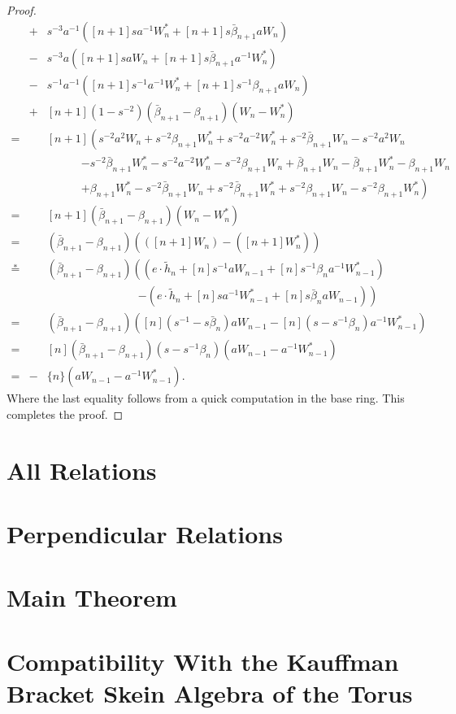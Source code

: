 \begin{proof}
\begin{eqnarray*}
&+& s^{-3}a^{-1}\left( [n+1]sa^{-1}W^*_n + [n+1]s\bar{\beta}_{n+1}aW_n \right) \\
&-&s^{-3}a\left( [n+1]saW_n + [n+1]s\bar{\beta}_{n+1}a^{-1}W^*_n \right) \\
&-& s^{-1}a^{-1}\left( [n+1]s^{-1}a^{-1}W^*_n + [n+1]s^{-1}\beta_{n+1}aW_n \right) \\
&+& [n+1]\left(1-s^{-2} \right) \left( \bar{\beta}_{n+1} - \beta_{n+1} \right) \left( W_n - W^*_n \right)\\
=&& [n+1]\left( s^{-2}a^2W_n + s^{-2}\beta_{n+1}W^*_n + s^{-2}a^{-2}W^*_n + s^{-2}\bar{\beta}_{n+1}W_n - s^{-2}a^{2}W_n \right. \\
&&\qquad\quad \left. - s^{-2}\bar{\beta}_{n+1}W^*_n - s^{-2}a^{-2}W^*_n - s^{-2}\beta_{n+1}W_n + \bar{\beta}_{n+1}W_n - \bar{\beta}_{n+1}W^*_n - \beta_{n+1}W_n \right. \\
&&\qquad\quad \left. + \beta_{n+1}W^*_n - s^{-2}\bar{\beta}_{n+1}W_n + s^{-2}\bar{\beta}_{n+1}W^*_n + s^{-2}\beta_{n+1}W_n - s^{-2}\beta_{n+1}W^*_n \right) \\
=&& [n+1]\left( \bar{\beta}_{n+1} - \beta_{n+1} \right) \left( W_n - W^*_n \right) \\
=&& \left( \bar{\beta}_{n+1} - \beta_{n+1} \right) \left( \left( [n+1]W_n \right) - \left( [n+1]W^*_n \right) \right) \\
\overset{\ast}{=}&& \left( \bar{\beta}_{n+1} - \beta_{n+1} \right) \left( \left( e \cdot \tilde{h}_{n} + [n]s^{-1}aW_{n-1} + [n]s^{-1}\beta_{n}a^{-1}W^*_{n-1} \right) \right. \\
&& \qquad\qquad\qquad\qquad \left. -\left( e \cdot \tilde{h}_{n} + [n]sa^{-1}W^*_{n-1} + [n]s\bar{\beta}_{n}aW_{n-1} \right) \right) \\
=&& \left( \bar{\beta}_{n+1} - \beta_{n+1} \right) \left( [n]\left( s^{-1} - s\bar{\beta}_{n} \right) aW_{n-1} - [n]\left( s-s^{-1}\beta_{n} \right) a^{-1}W^*_{n-1} \right) \\
=&& [n]\left(\bar{\beta}_{n+1} - \beta_{n+1} \right) \left( s - s^{-1}\beta_{n} \right) \left( aW_{n-1} - a^{-1}W^*_{n-1} \right) \\
=&-& \{n\}\left( aW_{n-1} - a^{-1}W^*_{n-1} \right).
\end{eqnarray*}
Where the last equality follows from a quick computation in the base ring. This completes the proof.
\end{proof}


\section{All Relations}




\section{Perpendicular Relations}




\section{Main Theorem}




\section{Compatibility With the Kauffman Bracket Skein Algebra of the Torus}